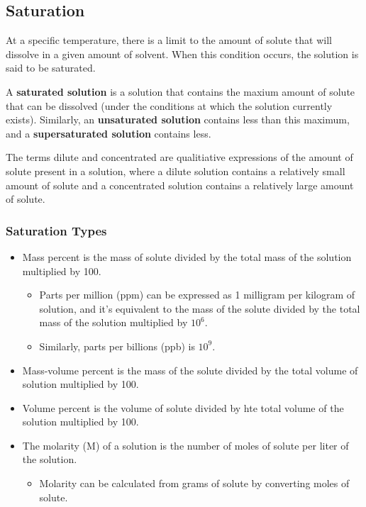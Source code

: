 \subsection{Saturation}

At a specific temperature, there is a limit to the amount of solute that will dissolve in a given amount of solvent. When this condition occurs, the solution is said to be saturated.

\begin{defn}
A \textbf{saturated solution} is a solution that contains the maxium amount of solute that can be dissolved (under the conditions at which the solution currently exists). Similarly, an \textbf{unsaturated solution} contains less than this maximum, and a \textbf{supersaturated solution} contains less.
\end{defn}

\noindent
The terms dilute and concentrated are qualitiative expressions of the amount of solute present in a solution, where a dilute solution contains a relatively small amount of solute and a concentrated solution contains a relatively large amount of solute. \\

\subsubsection{Saturation Types}

\begin{itemize}
\item Mass percent is the mass of solute divided by the total mass of the solution multiplied by 100.
	\begin{itemize}
	\item Parts per million (ppm) can be expressed as 1 milligram per kilogram of solution, and it's equivalent to the mass of the solute divided by the total mass of the solution multiplied by $10^6$.
	\item Similarly, parts per billions (ppb) is $10^9$.
	\end{itemize}
\item Mass-volume percent is the mass of the solute divided by the total volume of solution multiplied by 100.
\item Volume percent is the volume of solute divided by hte total volume of the solution multiplied by 100.
\item The molarity (M) of a solution is the number of moles of solute per liter of the solution.
	\begin{itemize}
	\item Molarity can be calculated from grams of solute by converting moles of solute.
	\end{itemize}
\end{itemize}

